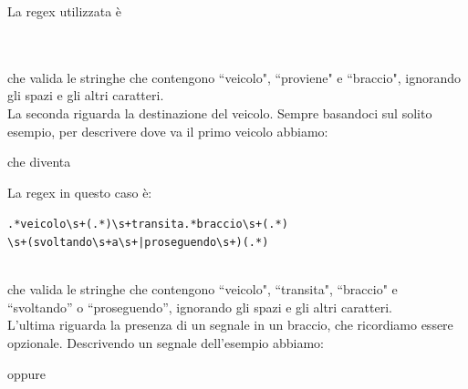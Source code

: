 \begin{flushleft}
	La regex utilizzata è
\end{flushleft}
\par \mbox{} \\\\
che valida le stringhe che contengono ``veicolo", ``proviene" e ``braccio", ignorando gli spazi e gli altri caratteri. \\


La seconda riguarda la destinazione del veicolo. Sempre basandoci sul solito esempio, per descrivere dove va il primo veicolo abbiamo: \\

\par \mbox{}
\begin{flushleft}
	che diventa
\end{flushleft}
\par \mbox{}
\begin{flushleft}
	La regex in questo caso è:
\end{flushleft}


\setlength{\FrameSep}{6pt}
\setlength{\FrameRule}{3pt}
\begin{varwidth}{10cm}
	\begin{framed}
		\texttt{.*veicolo\textbackslash s+(.*)\textbackslash s+transita.*braccio\textbackslash  s+(.*)} \\
		\texttt{\textbackslash s+(svoltando\textbackslash s+a\textbackslash s+|proseguendo\textbackslash s+)(.*)}		
	\end{framed}
\end{varwidth} \\


che valida le stringhe che contengono ``veicolo", ``transita", ``braccio" e ``svoltando'' o ``proseguendo'', ignorando gli spazi e gli altri caratteri. \\

L'ultima riguarda la presenza di un segnale in un braccio, che ricordiamo essere opzionale. Descrivendo un segnale dell'esempio abbiamo: \\

\mbox{}
\begin{flushleft}
	oppure
\end{flushleft}

